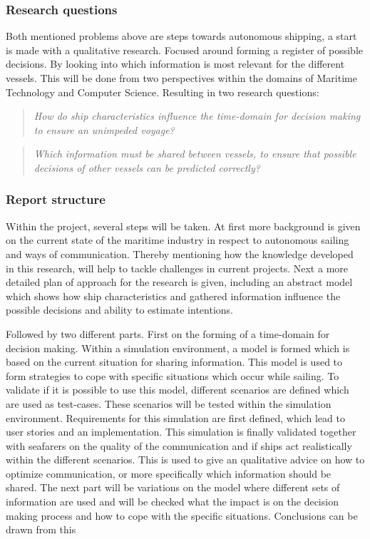
\subsubsection*{Research questions}
Both mentioned problems above are steps towards autonomous shipping, a start is made with a qualitative research. Focused around forming a register of possible decisions. By looking into which information is most relevant for the different vessels. This will be done from two perspectives within the domains of Maritime Technology and Computer Science. Resulting in two research questions:

\begin{quotation}
	\emph{How do ship characteristics influence the time-domain for decision making to ensure an unimpeded voyage?} 
\end{quotation}

\begin{quotation}
	\emph{Which information must be shared between vessels, to ensure that possible decisions of other vessels can be predicted correctly?}
\end{quotation}

\subsubsection*{Report structure}
Within the project, several steps will be taken. At first more background is given on the current state of the maritime industry in respect to autonomous sailing and ways of communication. Thereby mentioning how the knowledge developed in this research, will help to tackle challenges in current projects.
Next a more detailed plan of approach for the research is given, including an abstract model which shows how ship characteristics and gathered information influence the possible decisions and ability to estimate intentions.

Followed by two different parts. First on the forming of a time-domain for decision making. Within a simulation environment, a model is formed which is based on the current situation for sharing information. This model is used to form strategies to cope with specific situations which occur while sailing. To validate if it is possible to use this model, different scenarios are defined which are used as test-cases. These scenarios will be tested within the simulation environment. Requirements for this simulation are first defined, which lead to user stories and an implementation.
This simulation is finally validated together with seafarers on the quality of the communication and if ships act realistically within the different scenarios. This is used to give an qualitative advice on how to optimize communication, or more specifically which information should be shared.
The next part will be variations on the model where different sets of information are used and will be checked what the impact is on the decision making process and how to cope with the specific situations.
Conclusions can be drawn from this 